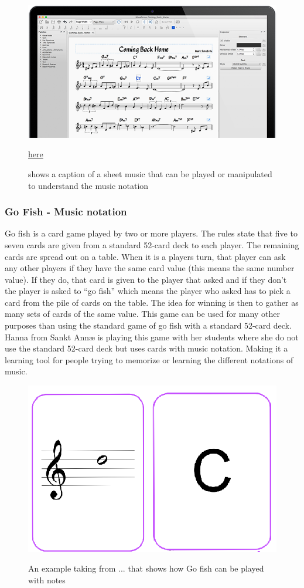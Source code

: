 \begin{figure}[H]
	\centering
	\includegraphics[width=0.8\linewidth]{figure/Analysis/musescore.png}
	\label{fig:MuseScore}
	\caption{shows a caption of a sheet music that can be played or manipulated to understand the music notation}
	\href{https://musescore.org/da}{\color{blue}here}
\end{figure}

\subsubsection{Go Fish - Music notation} 
Go fish is a card game played by two or more players. The rules state that five to seven cards are given from a standard 52-card deck to each player. The remaining cards are spread out on a table. When it is a players turn, that player can ask any other players if they have the same card value (this means the same number value). If they do, that card is given to the player that asked and if they don’t the player is asked to “go fish” which means the player who asked has to pick a card from the pile of cards on the table. The idea for winning is then to gather as many sets of cards of the same value. This game can be used for many other purposes than using the standard game of go fish with a standard 52-card deck. Hanna from Sankt Annæ is playing this game with her students where she do not use the standard 52-card deck but uses cards with music notation. Making it a learning tool for people trying to memorize or learning the different notations of music. 

\begin{figure}[H]
	\centering
	\includegraphics[width=0.7\linewidth]{figure/Analysis/gofish}
	\label{fig:gofish}
	\caption{An example taking from ... that shows how Go fish can be played with notes}
\end{figure}

